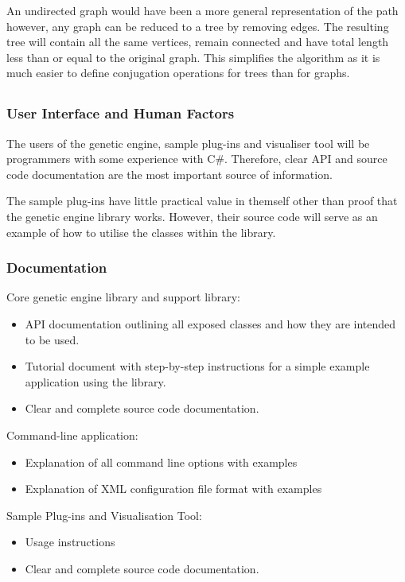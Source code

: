 \documentclass[a4paper]{article}
\begin{document}
An undirected graph would have been a more general representation of the path however, any graph can be reduced to a tree by removing edges. The resulting tree will contain all the same vertices, remain connected and have total length less than or equal to the original graph. This simplifies the algorithm as it is much easier to define conjugation operations for trees than for graphs.


\subsection{}
\subsubsection{User Interface and Human Factors}
The users of the genetic engine, sample plug-ins and visualiser tool will be programmers with some experience with C\#. Therefore, clear API and source code documentation are the most important source of information.

The sample plug-ins have little practical value in themself other than proof that the genetic engine library works. However, their source code will serve as an example of how to utilise the classes within the library.

\subsubsection{Documentation}
Core genetic engine library and support library:
\begin{itemize}
 \item API documentation outlining all exposed classes and how they are intended to be used.
 \item Tutorial document with step-by-step instructions for a simple example application using the library.
 \item Clear and complete source code documentation.
\end{itemize}

Command-line application:
\begin{itemize}
 \item Explanation of all command line options with examples
 \item Explanation of XML configuration file format with examples
\end{itemize}

Sample Plug-ins and Visualisation Tool:
\begin{itemize}
 \item Usage instructions
 \item Clear and complete source code documentation.
\end{itemize}
\end{document}
